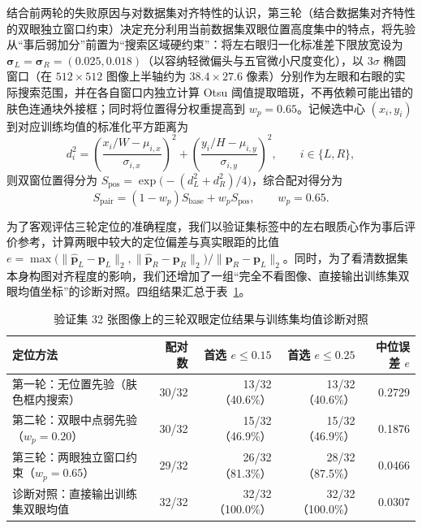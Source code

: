 结合前两轮的失败原因与对数据集对齐特性的认识，第三轮（结合数据集对齐特性的双眼独立窗口约束）决定充分利用当前数据集双眼位置高度集中的特点，将先验从“事后弱加分”前置为“搜索区域硬约束”：将左右眼归一化标准差下限放宽设为 $\boldsymbol{\sigma}_L=\boldsymbol{\sigma}_R=(0.025, 0.018)$（以容纳轻微偏头与五官微小尺度变化），以 $3\sigma$ 椭圆窗口（在 $512\times512$ 图像上半轴约为 $38.4\times27.6$ 像素）分别作为左眼和右眼的实际搜索范围，并在各自窗口内独立计算 Otsu 阈值提取暗斑，不再依赖可能出错的肤色连通块外接框；同时将位置得分权重提高到 $w_p=0.65$。记候选中心 $(x_i, y_i)$ 到对应训练均值的标准化平方距离为
\begin{equation}
d_i^2 = \left(\frac{x_i/W - \mu_{i,x}}{\sigma_{i,x}}\right)^2 + \left(\frac{y_i/H - \mu_{i,y}}{\sigma_{i,y}}\right)^2, \qquad i\in\{L,R\},
\label{eq:eyedist}
\end{equation}
则双窗位置得分为 $S_{\text{pos}}=\exp\bigl(-(d_L^2+d_R^2)/4\bigr)$，综合配对得分为
\begin{equation}
S_{\text{pair}} = (1 - w_p)S_{\text{base}} + w_p S_{\text{pos}}, \qquad w_p = 0.65.
\label{eq:eyepairscore}
\end{equation}

为了客观评估三轮定位的准确程度，我们以验证集标签中的左右眼质心作为事后评价参考，计算两眼中较大的定位偏差与真实眼距的比值 $e = \max\bigl(\|\hat{\mathbf{p}}_L-\mathbf{p}_L\|_2, \|\hat{\mathbf{p}}_R-\mathbf{p}_R\|_2\bigr) / \|\mathbf{p}_R-\mathbf{p}_L\|_2$。同时，为了看清数据集本身构图对齐程度的影响，我们还增加了一组“完全不看图像、直接输出训练集双眼均值坐标”的诊断对照。四组结果汇总于表~\ref{tab:lab4_eyes}。

\begin{table}[H]
\centering\footnotesize
\setlength{\tabcolsep}{3.5pt}
\caption{验证集 32 张图像上的三轮双眼定位结果与训练集均值诊断对照}\label{tab:lab4_eyes}
\begin{tabular}{lrrrr}
\toprule
定位方法 & 配对数 & 首选 $e\le 0.15$ & 首选 $e\le 0.25$ & 中位误差 $e$ \\
\midrule
第一轮：无位置先验（肤色框内搜索） & 30/32 & 13/32（40.6\%） & 13/32（40.6\%） & 0.2729 \\
第二轮：双眼中点弱先验（$w_p=0.20$） & 30/32 & 15/32（46.9\%） & 15/32（46.9\%） & 0.1876 \\
第三轮：两眼独立窗口约束（$w_p=0.65$） & 29/32 & 26/32（81.3\%） & 28/32（87.5\%） & 0.0466 \\
诊断对照：直接输出训练集双眼均值 & 32/32 & 32/32（100.0\%） & 32/32（100.0\%） & 0.0307 \\
\bottomrule
\end{tabular}
\end{table}

